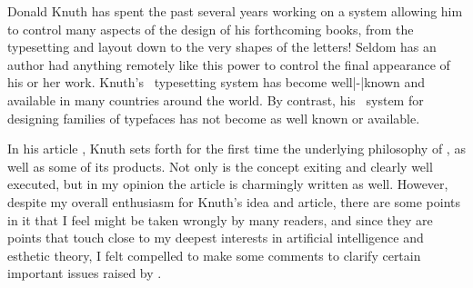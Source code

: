 Donald Knuth has spent the past several years working on a
system allowing him to control many aspects of the design
of his forthcoming books, from the typesetting and layout
down to the very shapes of the letters! Seldom has an
author had anything remotely like this power to control the
final appearance of his or her work. Knuth's \TEX\
typesetting system has become well|-|known and available in
many countries around the world. By contrast, his
\METAFONT\ system for designing families of typefaces has
not become as well known or available.

In his article ,
Knuth sets forth for the first time the underlying
philosophy of \METAFONT, as well as some of its products.
Not only is the concept exiting and clearly well executed,
but in my opinion the article is charmingly written as well.
However, despite my overall enthusiasm for Knuth's idea and
article, there are some points in it that I feel might be
taken wrongly by many readers, and since they are points
that touch close to my deepest interests in artificial
intelligence and esthetic theory, I felt compelled to make
some comments to clarify certain important issues raised by
.
